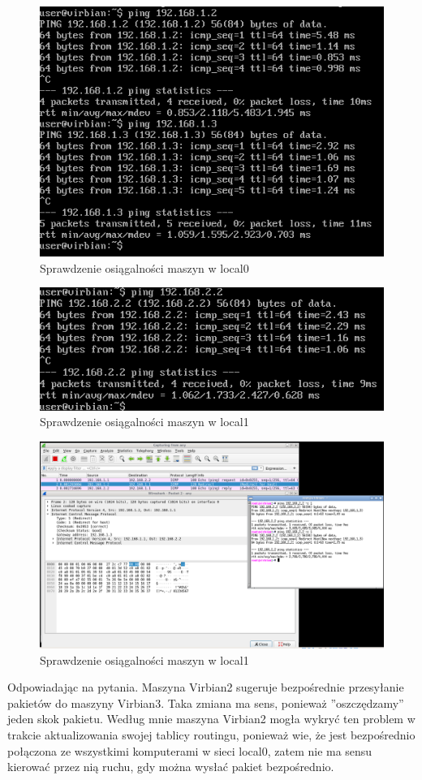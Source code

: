 \documentclass[a4paper]{scrartcl}
\begin{document}
\begin{figure}
  \includegraphics[width=\linewidth]{pings_connected.png}
  \caption{Sprawdzenie osiągalności maszyn w local0}
\end{figure}
\begin{figure}
  \includegraphics[width=\linewidth]{ping_connected1.png}
  \caption{Sprawdzenie osiągalności maszyn w local1}
\end{figure}
\begin{figure}
  \includegraphics[width=\linewidth]{redirect_vib1.png}
  \caption{Sprawdzenie osiągalności maszyn w local1}
\end{figure}
Odpowiadając na pytania. Maszyna Virbian2 sugeruje bezpośrednie przesyłanie pakietów do maszyny Virbian3. Taka zmiana ma sens, ponieważ ''oszczędzamy'' jeden skok pakietu. Według mnie maszyna Virbian2 mogła wykryć ten problem w trakcie aktualizowania swojej tablicy routingu, ponieważ wie, że jest bezpośrednio połączona ze wszystkimi komputerami w sieci local0, zatem nie ma sensu kierować przez nią ruchu, gdy można wysłać pakiet bezpośrednio.
\end{document}

